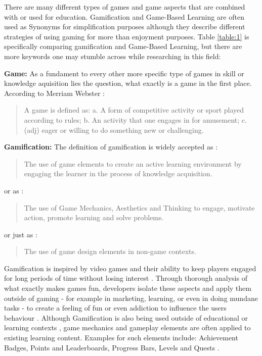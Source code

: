 There are many different types of games and game aspects that are combined with or used for education. Gamification and Game-Based Learning are often used as Synonyms for simplification purposes although they describe different strategies of using gaming for more than enjoyment purposes. Table \ref{table:1} is specifically comparing gamification and Game-Based Learning, but there are more keywords one may stumble across while researching in this field:

\textbf{Game:}
As a fundament to every other more specific type of games in skill or knowledge aquisition lies the question, what exactly is a game in the first place.
According to Merriam Webster \cite{fail}: 
\begin{quote} 
    A game is defined as: a. A form of competitive activity or sport played according to rules;
    b. An activity that one engages in for amusement; 
    c. (adj) eager or willing to do something new or challenging. 
\end{quote}
\indent
\textbf{Gamification:}
The definition of gamification is widely accepted as \cite{higher}: 
\begin{quote}
The use of game elements to create an active learning environment by engaging the learner in the process of knowledge acquisition.
\end{quote}
or as \cite{edu}:
\begin{quote}
The use of Game Mechanics, Aesthetics and Thinking to engage, motivate action, promote learning and solve problems.
\end{quote}
or just as \cite{higher} \cite{edu}:
\begin{quote}
The use of game design elements in non-game contexts.
\end{quote}
Gamification is inspired by video games and their ability to keep players engaged for long periods of time without losing interest \cite{equilibrium}. Through thorough analysis of what exactly makes games fun, developers isolate these aspects and apply them outside of gaming - for example in marketing, learning, or even in doing mundane tasks - to create a feeling of fun or even addiction to influence the users behaviour \cite{edu} \cite{fail}.
Although Gamification is also being used outside of educational or learning contexts \cite{compare}, game mechanics and gameplay elements are often applied to existing learning content.
Examples for such elements include: Achievement Badges, Points and Leaderboards, Progress Bars, Levels and Quests \cite{compare}.

